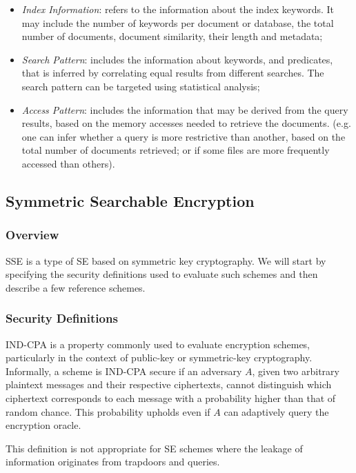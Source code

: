 \begin{itemize}
    \item \emph{Index Information}: refers to the information about the index keywords. It may include the number of keywords per document or database, the total number of documents, document similarity, their length and metadata;
    \item \emph{Search Pattern}: includes the information about keywords, and predicates, that is inferred by correlating equal results from different searches. The search pattern can be targeted using statistical analysis;
    \item \emph{Access Pattern}: includes the information that may be derived from the query results, based on the memory accesses needed to retrieve the documents. (e.g. one can infer whether a query is more restrictive than another, based on the total number of documents retrieved; or if some files are more frequently accessed than others). 
\end{itemize}

\subsection{Symmetric Searchable Encryption}
\label{ch2:sec:symmetric-searchable-encryption}

\subsubsection{Overview}

\gls{SSE} is a type of \gls{SE} based on symmetric key cryptography. We will start by specifying the security definitions used to evaluate such schemes and then describe a few reference schemes.

\subsubsection{Security Definitions}

\gls{IND-CPA} is a property commonly used to evaluate encryption schemes, particularly in the context of public-key or symmetric-key cryptography. Informally, a scheme is \gls{IND-CPA} secure if an adversary $A$, given two arbitrary plaintext messages and their respective ciphertexts, cannot distinguish which ciphertext corresponds to each message with a probability higher than that of random chance. This probability upholds even if $A$ can adaptively query the encryption oracle. 

This definition is not appropriate for \gls{SE} schemes where the leakage of information originates from trapdoors and queries.

